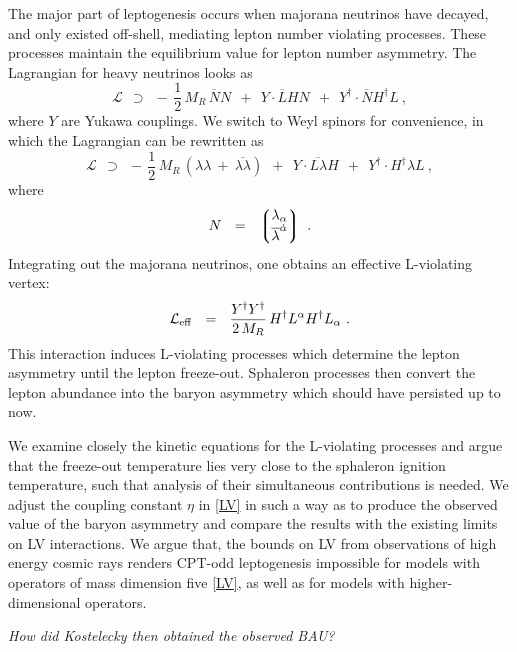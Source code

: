 \documentclass[12pt]{revtex4}
\newcommand{\ov}{\overline}
\begin{document}
	The major part of leptogenesis occurs when majorana neutrinos have decayed,
	and only existed off-shell, mediating lepton number violating processes.
	These processes maintain the equilibrium value for 
	lepton number asymmetry. 
	The Lagrangian for heavy neutrinos looks as
\begin{equation}
	\mathcal{L}  ~~\supset~~ -\,\frac 12\, M_R\, \ov{N}N ~~+~~
				Y\cdot \ov{L}HN ~~+~~  Y^\dagger\cdot \ov{N}H^\dagger L~,
\end{equation}
	where $ Y $ are Yukawa couplings.
	We switch to Weyl spinors for convenience, in which the Lagrangian can be rewritten as
\begin{equation}
	\mathcal{L}  ~~\supset~~ 
	-\,\frac 12\, M_R\, \left( \lambda\lambda ~+~ \ov{\lambda\lambda} \right) ~~+~~
				Y\cdot \ov{L\lambda}H ~~+~~  Y^\dagger\cdot H^\dagger \lambda L~,
\end{equation}
	where
\[	
	N  ~~=~~ \left\lgroup 
		\begin{matrix}
			\lambda_\alpha \\
			\ov{\lambda}^{\dot{\alpha}}
		\end{matrix}
		\right\rgroup~.
\]
	Integrating out the majorana neutrinos, one obtains an effective L-violating vertex:
\begin{equation}
\label{L_eff}
	\mathcal{L}_{\rm eff} ~~=~~ \frac{Y^\dag Y^\dag}{2\, M_R} \, H^\dag L^\alpha H^\dag L_\alpha~.
\end{equation}
	This interaction induces L-violating processes which determine the lepton asymmetry
	until the lepton freeze-out.
	Sphaleron processes then convert the lepton abundance into the baryon asymmetry which
	should have persisted up to now.

	We examine closely the kinetic equations for the L-violating processes and argue that
	the freeze-out temperature lies very close to the sphaleron ignition temperature, such
	that analysis of their simultaneous contributions is needed. 
	We adjust the coupling constant $ \eta $ in \eqref{LV} in such a way as to produce 
	the observed value of the baryon asymmetry and compare the results with the existing
	limits on LV interactions. 
	We argue that, the bounds on LV from observations of high energy cosmic rays renders
	CPT-odd leptogenesis impossible for models with operators of mass dimension five \eqref{LV}, 
	as well as for models with higher-dimensional operators.
	
	{\it How did Kostelecky then obtained the observed BAU?}
	

%
%
\end{document}
